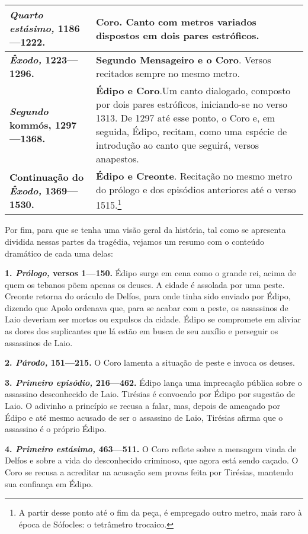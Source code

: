 \begin{tabular}[c]{|p{}|p{}|}
    \textbf{\emph{Quarto estásimo,} 1186---1222.}               & \textbf{Coro}. Canto com metros variados dispostos em dois pares estróficos. \\ \hline
    \textbf{\emph{Êxodo,} 1223---1296.}                         & \textbf{Segundo Mensageiro e o Coro}. Versos recitados sempre no mesmo metro. \\ \hline
    \textbf{\emph{Segundo} kommós, 1297---1368.}                & \textbf{Édipo e Coro}.Um canto dialogado, composto por dois pares estróficos, iniciando-se no verso 1313. De 1297 até esse ponto, o Coro e, em seguida, Édipo, recitam, como uma espécie de introdução ao canto que seguirá, versos anapestos. \\ \hline
    \textbf{Continuação do \emph{Êxodo,} 1369---1530.}          & \textbf{Édipo e Creonte}. Recitação no mesmo metro do prólogo e dos episódios anteriores até o verso 1515.\footnote{A partir desse ponto até o fim da peça, é empregado outro metro, mais raro à época de Sófocles: o tetrâmetro trocaico.} \\ \hline
    \end{tabular}
    



Por fim, para que se tenha uma visão geral da história, tal como se
apresenta dividida nessas partes da tragédia, vejamos um resumo com o
conteúdo dramático de cada uma delas:

\textbf{1. \emph{Prólogo,} versos 1---150.} Édipo surge em cena como o
grande rei, acima de quem os tebanos põem apenas os deuses. A cidade é
assolada por uma peste. Creonte retorna do oráculo de Delfos, para onde
tinha sido enviado por Édipo, dizendo que Apolo ordenava que, para se
acabar com a peste, os assassinos de Laio deveriam ser mortos ou
expulsos da cidade. Édipo se compromete em aliviar as dores dos
suplicantes que lá estão em busca de seu auxílio e perseguir os
assassinos de Laio.

\textbf{2. \emph{Párodo,} 151---215.} O Coro lamenta a situação
de peste e invoca os deuses.

\textbf{3. \emph{Primeiro episódio,} 216---462.} Édipo lança uma
imprecação pública sobre o assassino desconhecido de Laio. Tirésias é
convocado por Édipo por sugestão de Laio. O adivinho a princípio se
recusa a falar, mas, depois de ameaçado por Édipo e até mesmo acusado de
ser o assassino de Laio, Tirésias afirma que o assassino é o próprio
Édipo.

\textbf{4. \emph{Primeiro estásimo,} 463---511.} O Coro reflete sobre a
mensagem vinda de Delfos e sobre a vida do desconhecido criminoso, que
agora está sendo caçado. O Coro se recusa a acreditar na acusação sem
provas feita por Tirésias, mantendo sua confiança em Édipo.

